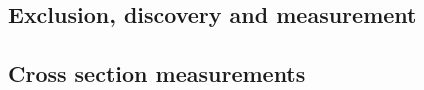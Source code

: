 

\subsection{Exclusion, discovery and measurement}
\label{sec:results:limits}


\subsection{Cross section measurements}
\label{sec:results:xs}


